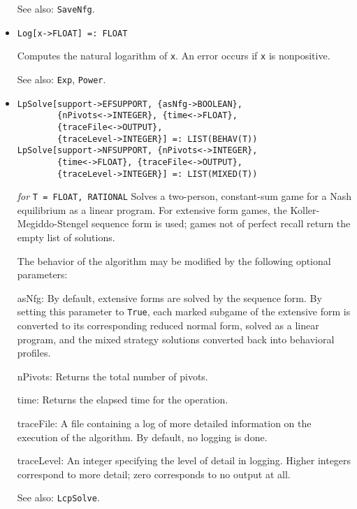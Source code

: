 \begin{itemize}
{\it for} {\tt T = FLOAT, RATIONAL}
\bd
Loads a normal form game from an external savefile.
An error occurs if the file cannot be opened, or if the file does not 
contain a valid normal form savefile.
\item [See also:] \verb+SaveNfg+.
\ed

\item
\protect \large \begin{verbatim}
Log[x->FLOAT] =: FLOAT
\end{verbatim} \normalsize

\bd
Computes the natural logarithm of \verb+x+.  An error occurs if
\verb+x+ is nonpositive.
\item [See also:] \verb+Exp+, \verb+Power+.
\ed

\item
\protect \large \begin{verbatim}
LpSolve[support->EFSUPPORT, {asNfg->BOOLEAN},
        {nPivots<->INTEGER}, {time<->FLOAT},
        {traceFile<->OUTPUT},
        {traceLevel->INTEGER}] =: LIST(BEHAV(T))
LpSolve[support->NFSUPPORT, {nPivots<->INTEGER},
        {time<->FLOAT}, {traceFile<->OUTPUT},
        {traceLevel->INTEGER}] =: LIST(MIXED(T))
\end{verbatim}\normalsize

{\it for} {\tt T = FLOAT, RATIONAL}
\bd
Solves a two-person, constant-sum game for a Nash equilibrium as a linear
program.  For extensive form games, the Koller-Megiddo-Stengel
sequence form is used; games not of perfect recall return the empty
list of solutions.

The behavior of the algorithm may be modified by the following optional
parameters:
\bd
\item
[asNfg:] By default, extensive forms are solved by the sequence form.
By setting this parameter to \verb+True+, each marked subgame of the
extensive form is converted to its corresponding reduced normal form,
solved as a linear program, and the mixed strategy solutions converted back
into behavioral profiles.
\item
[nPivots:] Returns the total number of pivots.
\item
[time:] Returns the elapsed time for the operation.
\item
[traceFile:] A file containing a log of more detailed information on the
execution of the algorithm.  By default, no logging is done.
\item
[traceLevel:] An integer specifying the level of detail in logging.
Higher integers correspond to more detail; zero corresponds to no
output at all.
\ed
\item [See also:] \verb+LcpSolve+.
\ed


\end{itemize}
